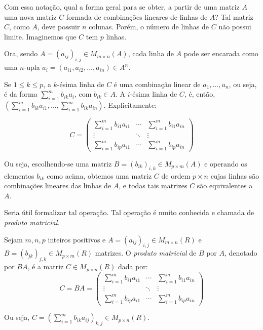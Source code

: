 Com essa notação, qual a forma geral para se obter, a partir de uma matriz $A$ uma nova matriz $C$ formada de combinações lineares de linhas de $A$?
Tal matriz $C$, como $A$, deve possuir $n$ colunas. Porém, o número de linhas de $C$ não possui limite. Imaginemos que $C$ tem $p$ linhas.

Ora, sendo $A=(a_{ij})_{i, j}\in M_{m \times n}(A)$, cada linha de $A$ pode ser encarada como uma $n$-upla $a_i=(a_{i1}, a_{i2}, \ldots, a_{in})\in A^n$.

Se $1\leq k \leq p$, a $k$-ésima linha de $C$ é uma combinação linear de $a_1, \dots, a_n$, ou seja, é da forma $\sum_{i=1}^m b_{ik} a_i$, com $b_{ik}\in A$.
A $i$-ésima linha de $C$, é, então, $(\sum_{i=1}^m b_{ik} a_{i1}, \dots, \sum_{i=1}^m b_{ik} a_{in})$.
Explicitamente:

\begin{equation*}
    C = \begin{pmatrix}
        \sum_{i=1}^m b_{i1} a_{i1} & \cdots & \sum_{i=1}^m b_{i1} a_{in} \\
        \vdots & \ddots & \vdots \\
        \sum_{i=1}^m b_{ip} a_{i1} & \cdots & \sum_{i=1}^m b_{ip} a_{in}
    \end{pmatrix}
\end{equation*}

Ou seja, escolhendo-se uma matriz $B=(b_{ik})_{i,k}\in M_{p \times m}(A)$ e operando os elementos $b_{ik}$ como acima, obtemos uma matriz $C$ de ordem $p \times n$ cujas linhas são combinações lineares das linhas de $A$, e todas tais matrizes $C$ são equivalentes a $A$.

Seria útil formalizar tal operação.
Tal operação é muito conhecida e chamada de \emph{produto matricial}.

\begin{definition}
    Sejam $m, n, p$ inteiros positivos e $A=(a_{ij})_{i, j}\in M_{m \times n}(R)$ e $B=(b_{jk})_{j, k}\in M_{p \times m}(R)$ matrizes.
    O \emph{produto matricial} de $B$ por $A$, denotado por $BA$, é a matriz $C\in M_{p \times n}(R)$ dada por:
    \begin{equation*}
        C = BA = \begin{pmatrix}
            \sum_{i=1}^m b_{i1} a_{i1} & \cdots & \sum_{i=1}^m b_{i1} a_{in} \\
            \vdots & \ddots & \vdots \\
            \sum_{i=1}^m b_{ip} a_{i1} & \cdots & \sum_{i=1}^m b_{ip} a_{in}
        \end{pmatrix}
    \end{equation*}

    Ou seja, $C=(\sum_{i=1}^m b_{ik} a_{ij})_{k, j}\in M_{p \times n}(R)$.
\end{definition}

